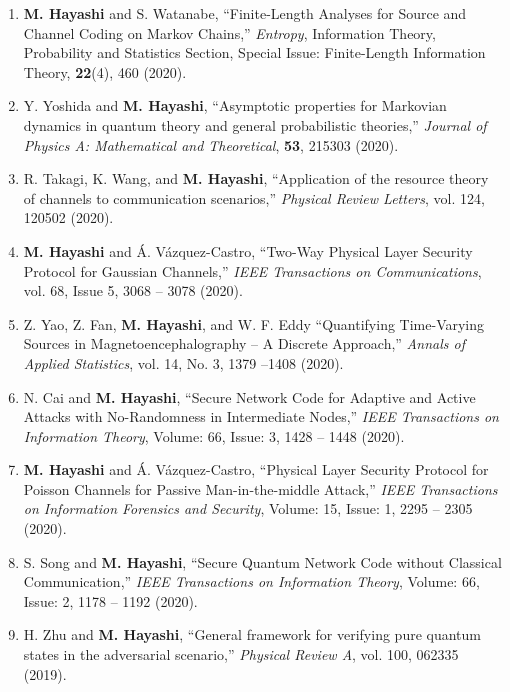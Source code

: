 \documentclass[a4paper,12pt,oneside]{article}
\begin{document}
\begin{enumerate}
\item  
\textbf{M. Hayashi} and S. Watanabe,
``Finite-Length Analyses for Source and Channel Coding on Markov Chains,'' 
{\em Entropy}, Information Theory, Probability and Statistics Section, Special Issue: Finite-Length Information Theory,  
{\bf 22}(4), 460 (2020).

\item  
Y. Yoshida and \textbf{M. Hayashi},
``Asymptotic properties for Markovian dynamics in quantum theory and general probabilistic theories,'' 
{\em Journal of Physics A: Mathematical and Theoretical}, 
{\bf 53}, 215303 (2020).

\item  
R. Takagi, K. Wang, and \textbf{M. Hayashi},
``Application of the resource theory of channels to communication scenarios,'' 
{\em Physical Review Letters}, 
vol. 124, 120502 (2020).

\item  
\textbf{M. Hayashi} and \'{A}. V\'{a}zquez-Castro,
``Two-Way Physical Layer Security Protocol for Gaussian Channels,'' 
{\em IEEE Transactions on Communications},
vol. 68, Issue 5, 3068 -- 3078 (2020).

\item  
Z. Yao, Z. Fan, \textbf{M. Hayashi}, and W. F. Eddy
``Quantifying Time-Varying Sources in Magnetoencephalography -- A Discrete Approach,''
{\em Annals of Applied Statistics},
vol. 14, No. 3, 1379 --1408 (2020).

\item  
N. Cai and \textbf{M. Hayashi},
``Secure Network Code for Adaptive and Active Attacks with No-Randomness in Intermediate Nodes,''
{\em IEEE Transactions on Information Theory}, Volume: 66, Issue: 3, 1428 -- 1448 (2020). 

\item  
\textbf{M. Hayashi} and \'{A}. V\'{a}zquez-Castro,
``Physical Layer Security Protocol for Poisson Channels 
for Passive Man-in-the-middle Attack,'' 
{\em IEEE Transactions on Information Forensics and Security},
Volume: 15, Issue: 1, 2295 -- 2305 (2020). 

\item  
S. Song and \textbf{M. Hayashi},
``Secure Quantum Network Code without Classical Communication,''
{\em IEEE Transactions on Information Theory}, 
Volume: 66, Issue: 2, 1178 -- 1192 (2020). 

\item 
H. Zhu and \textbf{M. Hayashi},
``General framework for verifying pure quantum states in the adversarial scenario,''
{\em Physical Review A}, 
vol. 100, 062335 (2019).
 

\end{enumerate}
\end{document}
